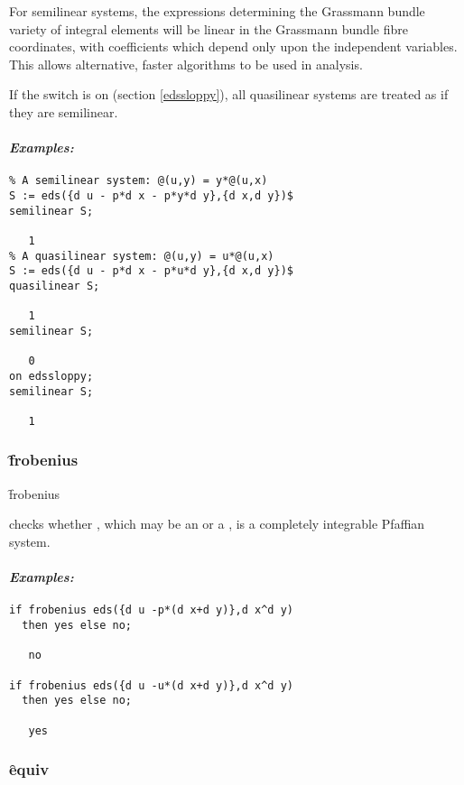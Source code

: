 For semilinear systems, the expressions determining the Grassmann bundle
variety of integral elements will be linear in the Grassmann bundle fibre
coordinates, with coefficients which depend only upon the independent
variables. This allows alternative, faster algorithms to be used in
analysis.

If the switch  is on (section \ref{edssloppy}), all
quasilinear systems are treated as if they are semilinear.

\paragraph{\textit{Examples:}}
\begin{verbatim}
% A semilinear system: @(u,y) = y*@(u,x)
S := eds({d u - p*d x - p*y*d y},{d x,d y})$
semilinear S;

   1
% A quasilinear system: @(u,y) = u*@(u,x)
S := eds({d u - p*d x - p*u*d y},{d x,d y})$
quasilinear S;

   1
semilinear S;

   0
on edssloppy;
semilinear S;

   1
\end{verbatim}

\subsubsection{\f{frobenius}}
\label{frobenius}

\hypertarget{operator:EDS_FROBENIUS}{}
\begin{syntax}
	\f{frobenius} 
\end{syntax}
checks whether , which may be an  or a ,
is a completely integrable Pfaffian system.

\paragraph{\textit{Examples:}}
\begin{verbatim}
if frobenius eds({d u -p*(d x+d y)},d x^d y)
  then yes else no;

   no

if frobenius eds({d u -u*(d x+d y)},d x^d y)
  then yes else no;

   yes
\end{verbatim}

\subsubsection{\f{equiv}}
\label{equiv}

